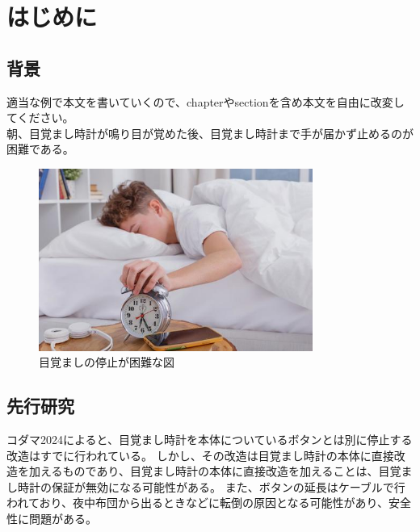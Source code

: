 \tableofcontents
\newpage

\pagestyle{fancy}
\fancyhf{}
\renewcommand{\headrulewidth}{0pt}
\makeatletter
\let\ps@plain\ps@fancy
\makeatother
\setlength{\headsep}{20pt}

\chapter{はじめに}
\section{背景}
適当な例で本文を書いていくので、chapterやsectionを含め本文を自由に改変してください。\\
朝、目覚まし時計が鳴り目が覚めた後、目覚まし時計まで手が届かず止めるのが困難である。
\begin{figure}[h!]
  \centering
  \includegraphics[width=0.8\textwidth]{pages/report/images/alarm-stopping.jpeg}
  \caption{目覚ましの停止が困難な図}
  \label{fig:sample}
\end{figure}

\section{先行研究}
コダマ2024\cite{目覚まし時計を改造}によると、目覚まし時計を本体についているボタンとは別に停止する改造はすでに行われている。
しかし、その改造は目覚まし時計の本体に直接改造を加えるものであり、目覚まし時計の本体に直接改造を加えることは、目覚まし時計の保証が無効になる可能性がある。
また、ボタンの延長はケーブルで行われており、夜中布団から出るときなどに転倒の原因となる可能性があり、安全性に問題がある。

